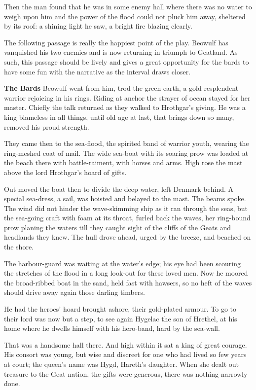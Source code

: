 \documentclass[a4paper]{article}
\begin{document}
{Then the man found
that he was in some enemy hall
where there was no water to weigh upon him
and the power of the flood could not pluck him away,
sheltered by its roof: a shining light he saw,
a bright fire blazing clearly.

\centerline{The following passage is really the happiest point of the play.
Beowulf has vanquished his two enemies and is now returning in triumph to Geatland.
As such, this passage should be lively and gives a great opportunity for the bards
to have some fun with the narrative as the interval draws closer.}

\textbf{The Bards} Beowulf went from him,
trod the green earth, a gold-resplendent warrior
rejoicing in his rings. Riding at anchor
the strayer of ocean stayed for her master.
Chiefly the talk returned as they walked
to Hrothgar’s giving. He was a king
blameless in all things, until old age at last,
that brings down so many, removed his proud strength.

They came then to the sea-flood, the spirited band
of warrior youth, wearing the ring-meshed
coat of mail.
The wide sea-boat with its soaring prow
was loaded at the beach there with battle-raiment,
with horses and arms. High rose the mast
above the lord Hrothgar’s hoard of gifts.

Out moved the boat then
to divide the deep water, left Denmark behind.
A special sea-dress, a sail, was hoisted
and belayed to the mast. The beams spoke.
The wind did not hinder the wave-skimming ship
as it ran through the seas, but the sea-going craft
with foam at its throat, furled back the waves,
her ring-bound prow planing the waters
till they caught sight of the cliffs of the Geats
and headlands they knew. The hull drove ahead,
urged by the breeze, and beached on the shore.

The harbour-guard was waiting at the water’s edge;
his eye had been scouring the stretches of the flood
in a long look-out for these loved men.
Now he moored the broad-ribbed boat in the sand,
held fast with hawsers, so no heft of the waves
should drive away again those darling timbers.

He had the heroes’ hoard brought ashore,
their gold-plated armour. To go to their lord
was now but a step, to see again Hygelac
the son of Hrethel, at his home where he dwells
himself with his hero-band, hard by the sea-wall.

That was a handsome hall there. And high within it sat
a king of great courage. His consort was young,
but wise and discreet for one who had lived
so few years at court; the queen’s name was Hygd,
Hareth’s daughter. When she dealt out treasure
to the Geat nation, the gifts were generous,
there was nothing narrowly done.

}
\end{document}
